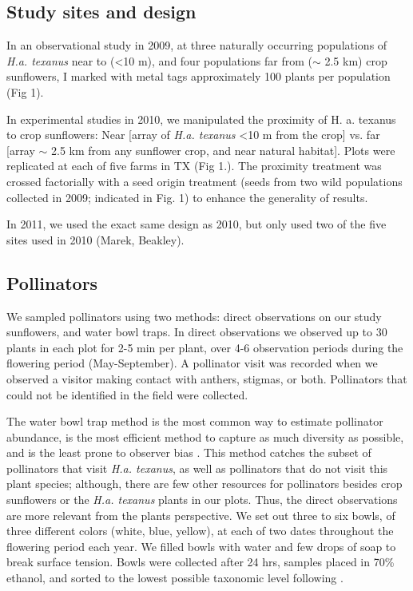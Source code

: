 \documentclass[12pt]{article}
\begin{document}
\subsection{Study sites and design}
In an observational study in 2009, at three naturally occurring populations of \textit{H.a. texanus} near to (\textless 10 m), and four populations far from ($\sim$ 2.5 km) crop sunflowers, I marked with metal tags approximately 100 plants per population (Fig 1).  

In experimental studies in 2010, we manipulated the proximity of H. a. texanus to crop sunflowers: Near [array of \textit{H.a. texanus} \textless 10 m from the crop] vs. far [array $\sim$ 2.5 km from any sunflower crop, and near natural habitat].  Plots were replicated at each of five farms in TX (Fig 1.).  The proximity treatment was crossed factorially with a seed origin treatment (seeds from two wild populations collected in 2009; indicated in Fig. 1) to enhance the generality of results.  
	
In 2011, we used the exact same design as 2010, but only used two of the five sites used in 2010 (Marek, Beakley).

\subsection{Pollinators}
We sampled pollinators using two methods: direct observations on our study sunflowers, and water bowl traps.  In direct observations we observed up to 30 plants in each plot for 2-5 min per plant, over 4-6 observation periods during the flowering period (May-September).  A pollinator visit was recorded when we observed a visitor making contact with anthers, stigmas, or both.  Pollinators that could not be identified in the field were collected.  

The water bowl trap method is the most common way to estimate pollinator abundance, is the most efficient method to capture as much diversity as possible, and is the least prone to observer bias \citep{Westphal2008}.  This method catches the subset of pollinators that visit \textit{H.a. texanus}, as well as pollinators that do not visit this plant species; although, there are few other resources for pollinators besides crop sunflowers or the \textit{H.a. texanus} plants in our plots.  Thus, the direct observations are more relevant from the plants perspective.  We set out three to six bowls, of three different colors (white, blue, yellow), at each of two dates throughout the flowering period each year.  We filled bowls with water and few drops of soap to break surface tension.  Bowls were collected after 24 hrs, samples placed in 70\% ethanol, and sorted to the lowest possible taxonomic level following \citet{Michener2000}.    
\end{document}
